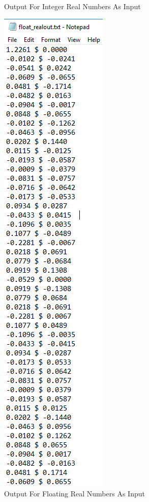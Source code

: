 \documentclass[12pt, titlepage]{article}
\begin{document}
\begin{figure}[h!]
\begin{minipage}[b]{0.5\textwidth}
\caption{Output For Integer Real Numbers As Input}
\label{Fig_OutputReal} 
\end{minipage}
\hfill
\begin{minipage}[b]{0.32\textwidth}
 \includegraphics[width=\textwidth]{Output_floatingReal}
\caption{Output For Floating Real Numbers As Input}
\label{Fig_OutputfloatingReal} 
\end{minipage}
\end{figure}
					
\end{document}
